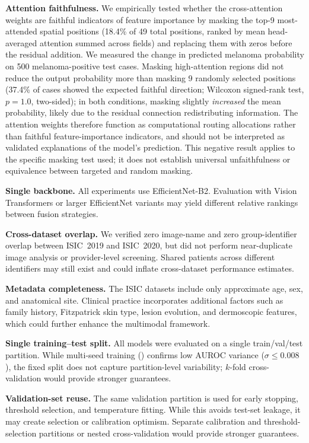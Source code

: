 \documentclass[12pt, a4paper]{article}
\begin{document}
\textbf{Attention faithfulness.} We empirically tested whether the cross-attention weights are faithful indicators of feature importance by masking the top-9 most-attended spatial positions (18.4\% of 49 total positions, ranked by mean head-averaged attention summed across fields) and replacing them with zeros before the residual addition. We measured the change in predicted melanoma probability on 500 melanoma-positive test cases. Masking high-attention regions did not reduce the output probability more than masking 9 randomly selected positions (37.4\% of cases showed the expected faithful direction; Wilcoxon signed-rank test, $p = 1.0$, two-sided); in both conditions, masking slightly \emph{increased} the mean probability, likely due to the residual connection redistributing information. The attention weights therefore function as computational routing allocations rather than faithful feature-importance indicators, and should not be interpreted as validated explanations of the model's prediction. This negative result applies to the specific masking test used; it does not establish universal unfaithfulness or equivalence between targeted and random masking.

\textbf{Single backbone.} All experiments use EfficientNet-B2. Evaluation with Vision Transformers or larger EfficientNet variants may yield different relative rankings between fusion strategies.

\textbf{Cross-dataset overlap.} We verified zero image-name and zero group-identifier overlap between ISIC~2019 and ISIC~2020, but did not perform near-duplicate image analysis or provider-level screening. Shared patients across different identifiers may still exist and could inflate cross-dataset performance estimates.

\textbf{Metadata completeness.} The ISIC datasets include only approximate age, sex, and anatomical site. Clinical practice incorporates additional factors such as family history, Fitzpatrick skin type, lesion evolution, and dermoscopic features, which could further enhance the multimodal framework.

\textbf{Single training--test split.} All models were evaluated on a single train/val/test partition. While multi-seed training () confirms low AUROC variance ($\sigma \leq 0.008$), the fixed split does not capture partition-level variability; $k$-fold cross-validation would provide stronger guarantees.

\textbf{Validation-set reuse.} The same validation partition is used for early stopping, threshold selection, and temperature fitting. While this avoids test-set leakage, it may create selection or calibration optimism. Separate calibration and threshold-selection partitions or nested cross-validation would provide stronger guarantees.
\end{document}
